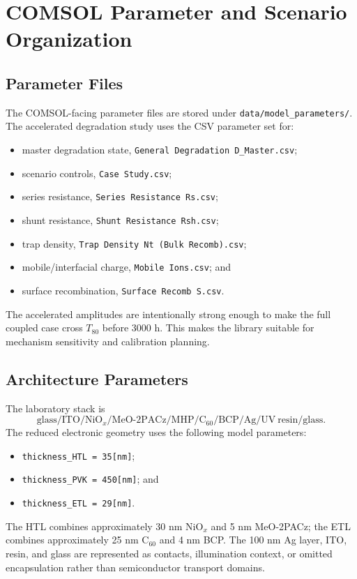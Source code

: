 \chapter{COMSOL Parameter and Scenario Organization}

\section{Parameter Files}

The COMSOL-facing parameter files are stored under
\texttt{data/model\_parameters/}. The accelerated degradation study uses the
CSV parameter set for:
\begin{itemize}
\item master degradation state, \texttt{General Degradation D\_Master.csv};
\item scenario controls, \texttt{Case Study.csv};
\item series resistance, \texttt{Series Resistance Rs.csv};
\item shunt resistance, \texttt{Shunt Resistance Rsh.csv};
\item trap density, \texttt{Trap Density Nt (Bulk Recomb).csv};
\item mobile/interfacial charge, \texttt{Mobile Ions.csv}; and
\item surface recombination, \texttt{Surface Recomb S.csv}.
\end{itemize}

The accelerated amplitudes are intentionally strong enough to make the full
coupled case cross $T_{80}$ before 3000 h. This makes the library suitable for
mechanism sensitivity and calibration planning.

\section{Architecture Parameters}

The laboratory stack is
\begin{equation}
\mathrm{glass}/\mathrm{ITO}/\mathrm{NiO}_x/
\mathrm{MeO\mbox{-}2PACz}/\mathrm{MHP}/
\mathrm{C}_{60}/\mathrm{BCP}/\mathrm{Ag}/
\mathrm{UV\ resin}/\mathrm{glass}.
\end{equation}
The reduced electronic geometry uses the following model parameters:
\begin{itemize}
\item \texttt{thickness\_HTL = 35[nm]};
\item \texttt{thickness\_PVK = 450[nm]}; and
\item \texttt{thickness\_ETL = 29[nm]}.
\end{itemize}
The HTL combines approximately 30 nm NiO$_x$
and 5 nm MeO-2PACz; the ETL combines approximately 25 nm C$_{60}$ and 4 nm
BCP. The 100 nm Ag layer, ITO, resin, and glass are represented as contacts,
illumination context, or omitted encapsulation rather than semiconductor
transport domains.

